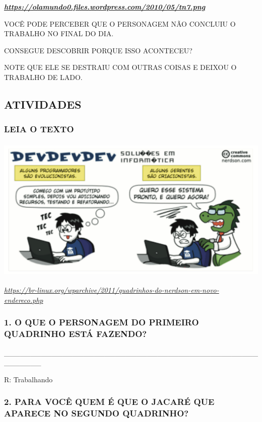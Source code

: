 \href{https://olamundo0.files.wordpress.com/2010/05/tn7.png}{\textbf{\emph{https://olamundo0.files.wordpress.com/2010/05/tn7.png}}}

VOCÊ PODE PERCEBER QUE O PERSONAGEM NÃO CONCLUIU O TRABALHO NO FINAL DO
DIA.

CONSEGUE DESCOBRIR PORQUE ISSO ACONTECEU?

NOTE QUE ELE SE DESTRAIU COM OUTRAS COISAS E DEIXOU O TRABALHO DE LADO.

\subsection{ATIVIDADES}\label{atividades-6}

\subsubsection{LEIA O TEXTO}\label{leia-o-texto-2}

\includegraphics[width=5.50365in,height=2.75183in]{media/image171.png}

\href{https://br-linux.org/wparchive/2011/quadrinhos-do-nerdson-em-novo-endereco.php}{\emph{https://br-linux.org/wparchive/2011/quadrinhos-do-nerdson-em-novo-endereco.php}}

\subsubsection{1. O QUE O PERSONAGEM DO PRIMEIRO QUADRINHO ESTÁ
FAZENDO?}\label{o-que-o-personagem-do-primeiro-quadrinho-estuxe1-fazendo}

\_\_\_\_\_\_\_\_\_\_\_\_\_\_\_\_\_\_\_\_\_\_\_\_\_\_\_\_\_\_\_\_\_\_\_\_\_\_\_\_\_\_\_\_\_\_\_\_\_\_\_\_\_\_\_

R: Trabalhando

\subsubsection{2. PARA VOCÊ QUEM É QUE O JACARÉ QUE APARECE NO SEGUNDO
QUADRINHO?}\label{para-vocuxea-quem-uxe9-que-o-jacaruxe9-que-aparece-no-segundo-quadrinho}

